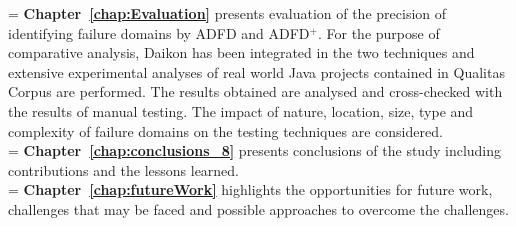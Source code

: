 \hangindent=\parindent
{}
\noindent
\textbf{Chapter~\ref{chap:Evaluation}} presents evaluation of the precision of identifying failure domains by ADFD and ADFD$^+$. For the purpose of comparative analysis, Daikon has been integrated in the two techniques and extensive experimental analyses of real world Java projects contained in Qualitas Corpus are performed. The results obtained are analysed and cross-checked with the results of manual testing. The impact of nature, location, size, type and complexity of failure domains on the testing techniques are considered. \\

\hangindent=\parindent
{}
\noindent
\textbf{Chapter~\ref{chap:conclusions_8}} presents conclusions of the study including contributions and the lessons learned.\\

\hangindent=\parindent
{}
\noindent
\textbf{Chapter~\ref{chap:futureWork}} highlights the opportunities for future work, challenges that may be faced and possible approaches to overcome the challenges.



